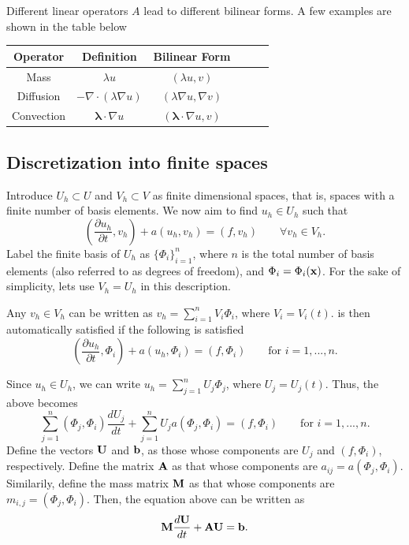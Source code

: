\documentclass[oneside,a4paper,11pt]{report}
\begin{document}
Different linear operators $A$ lead to different bilinear forms. A few examples are shown in the table below 
\begin{center}
\begin{tabular}{Sc|Sc|Sc}
    Operator & Definition & Bilinear Form \\
    \hline
    Mass & $ \lambda u $ & $(\lambda u, v)$ \\
    \hline
    Diffusion & $-\nabla \cdot ( \lambda \nabla u)$ & $(\lambda \nabla u, \nabla v)$ \\
    \hline
    Convection & $ \boldsymbol{\lambda} \cdot \nabla u $ & $(\boldsymbol{\lambda} \cdot \nabla u, v)$ \\
\end{tabular}
\end{center}

\subsection{Discretization into finite spaces}
Introduce $U_h \subset U$ and $V_h \subset V$ as finite dimensional spaces, that is, spaces with a finite number of basis elements. We now aim to find $u_h \in U_h$ such that
\begin{equation}
    \label{eq:fe_elliptic_sh_solution}
        \left ( \frac{\partial u_h}{\partial t} , v_h \right ) + a(u_h,v_h) = (f,v_h)\qquad \forall v_h \in V_h.
    \end{equation}
Label the finite basis of $U_h$ as $\{\Phi_i\}_{i=1}^n$, where $n$ is the total number of basis elements (also referred to as degrees of freedom), and $\Phi_i = \Phi_i(\mathbf{x})$. For the sake of simplicity, lets use $V_h = U_h$ in this description. 

Any $v_h \in V_h$ can be written as $v_h = \sum_{i=1}^n V_i \Phi_i$, where $V_i = V_i(t)$.  is then automatically satisfied if the following is satisfied
\begin{equation}
    \left ( \frac{\partial u_h}{\partial t}, \Phi_i \right ) + a(u_h, \Phi_i) = (f, \Phi_i) \qquad \text{for }i=1,...,n.
\end{equation}

Since $u_h \in U_h$, we can write $u_h = \sum_{j=1}^n U_j \Phi_j$, where $U_j = U_j(t)$. Thus, the above becomes
\begin{equation}
    \sum_{j=1}^n (\Phi_j, \Phi_i) \frac{dU_j}{dt} + \sum_{j=1}^n U_j a(\Phi_j,\Phi_i) = (f,\Phi_i) \qquad \text{for }i=1,...,n.
\end{equation}
Define the vectors $\mathbf{U}$ and $\mathbf{b}$, as those whose components are $U_j$ and $(f,\Phi_i)$, respectively. Define the matrix $\mathbf{A}$ as that whose components are $a_{ij} = a(\Phi_j,\Phi_i)$. Similarily, define the mass matrix $\mathbf{M}$ as that whose components are $m_{i,j} = (\Phi_j, \Phi_i)$. Then, the equation above can be written as
\begin{equation}
    \mathbf{M} \frac{d \mathbf{U}}{dt} + \mathbf{A} \mathbf{U} = \mathbf{b}.
\end{equation}
\end{document}
